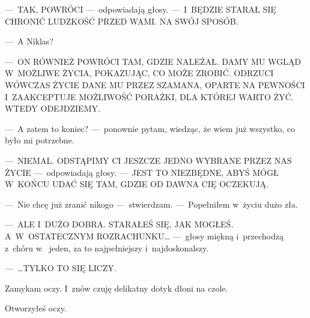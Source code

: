 ---~TAK, POWRÓCI ---~odpowiadają głosy. ---~I~BĘDZIE STARAŁ SIĘ CHRONIĆ LUDZKOŚĆ PRZED WAMI. NA SWÓJ SPOSÓB.

---~A Niklas?

---~ON RÓWNIEŻ POWRÓCI TAM, GDZIE NALEŻAŁ. DAMY MU WGLĄD W~MOŻLIWE ŻYCIA, POKAZUJĄC, CO MOŻE ZROBIĆ. ODRZUCI WÓWCZAS 
ŻYCIE DANE MU PRZEZ SZAMANA, OPARTE NA PEWNOŚCI I~ZAAKCEPTUJE MOŻLIWOŚĆ PORAŻKI, DLA KTÓREJ WARTO ŻYĆ. WTEDY 
ODEJDZIEMY.

---~A zatem to koniec? ---~ponownie pytam, wiedząc, że wiem już wszystko, co było mi potrzebne.

---~NIEMAL. ODSTĄPIMY CI JESZCZE JEDNO WYBRANE PRZEZ NAS ŻYCIE ---~odpowiadają głosy. ---~JEST TO NIEZBĘDNE, ABYŚ 
MÓGŁ W~KOŃCU UDAĆ SIĘ TAM, GDZIE OD DAWNA CIĘ OCZEKUJĄ.

---~Nie chcę już zranić nikogo ---~stwierdzam. ---~Popełniłem w~życiu dużo zła.

---~ALE I~DUŻO DOBRA. STARAŁEŚ SIĘ, JAK MOGŁEŚ. A~W~OSTATECZNYM ROZRACHUNKU… ---~głosy miękną i~przechodzą z~chóru w~
jeden, za to najpełniejszy i~najdoskonalszy.

---~…TYLKO TO SIĘ LICZY.

Zamykam oczy. I~znów czuję delikatny dotyk dłoni na czole.

\paraSep

Otworzyłeś oczy.